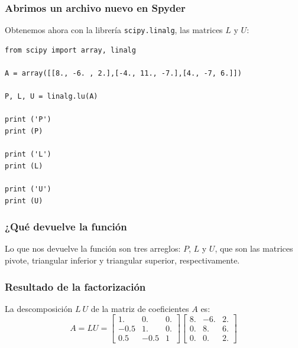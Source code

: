 \begin{frame}
\frametitle{Abrimos un archivo nuevo en Spyder}
Obtenemos ahora con la librería \texttt{scipy.linalg}, las matrices $L$ y $U$:
\begin{lstlisting}[caption=Código para obtener las matrices LU, style=FormattedNumber, basicstyle=\linespread{1.1}\ttfamily=\small, columns=fullflexible]
from scipy import array, linalg

A = array([[8., -6. , 2.],[-4., 11., -7.],[4., -7, 6.]])

P, L, U = linalg.lu(A)

print ('P')
print (P)

print ('L')
print (L)

print ('U')
print (U) 	
\end{lstlisting}
\end{frame}
\begin{frame}
\frametitle{¿Qué devuelve la función}
Lo que nos devuelve la función son tres arreglos: $P$, $L$ y $U$, que son las matrices pivote, triangular inferior y triangular superior, respectivamente.
\end{frame}
\begin{frame}
\frametitle{Resultado de la factorización}
La descomposición $L \: U$ de la matriz de coeficientes $A$ es:
\[ A = LU = \begin{bmatrix}
 1. &   0. &   0. \\
 -0.5 & 1. &  0. \\
 0.5 & -0.5 &  1
\end{bmatrix}
\begin{bmatrix}
 8. & -6. &  2. \\
  0. &  8. & 6. \\
  0. &  0. &  2.
\end{bmatrix} \]
\end{frame}
